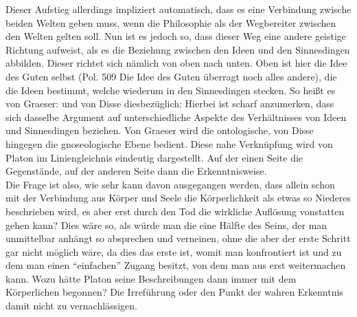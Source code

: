 Dieser Aufstieg allerdings impliziert automatisch, dass es eine Verbindung zwische beiden Welten geben muss, wenn die Philosophie als der Wegbereiter zwischen den Welten gelten soll.
Nun ist es jedoch so, dass dieser Weg eine andere geistige Richtung aufweist, als es die Beziehung zwischen den Ideen und den Sinnesdingen abbilden.
Dieser richtet sich nämlich von oben nach unten. Oben ist hier die Idee des Guten selbst (Pol. 509 Die Idee des Guten überragt noch alles andere), die die Ideen bestimmt, welche wiederum in den Sinnesdingen stecken. So heißt es von Graeser: 
 und von Disse diesbezüglich:
Hierbei ist scharf anzumerken, dass sich dasselbe Argument auf unterschiedliche Aspekte des Verhältnisses von Ideen und Sinnesdingen beziehen. Von Graeser wird die ontologische, von Disse hingegen die gnoseologische Ebene bedient. Diese nahe Verknüpfung wird von Platon im Liniengleichnis eindeutig dargestellt. Auf der einen Seite die Gegenstände, auf der anderen Seite dann die Erkenntnisweise.\\
Die Frage ist also, wie sehr kann davon ausgegangen werden, dass allein schon mit der Verbindung aus Körper und Seele die Körperlichkeit als etwas so Niederes beschrieben wird, es aber erst durch den Tod die wirkliche Auflösung vonstatten gehen kann? Dies wäre so, als würde man die eine Hälfte des Seins, der man unmittelbar anhängt so absprechen und verneinen, ohne die aber der erste Schritt gar nicht möglich wäre, da dies das erste ist, womit man konfrontiert ist und zu dem man einen \enquote{einfachen} Zugang besitzt, von dem man aus erst weitermachen kann. Wozu hätte Platon seine Beschreibungen dann immer mit dem Körperlichen begonnen? Die Irreführung oder den Punkt der wahren Erkenntnis damit nicht zu vernachlässigen.
